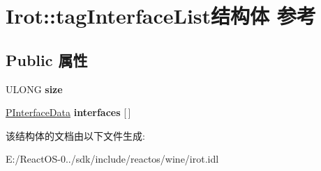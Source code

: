 \hypertarget{struct_irot_1_1tag_interface_list}{}\section{Irot\+:\+:tag\+Interface\+List结构体 参考}
\label{struct_irot_1_1tag_interface_list}
\subsection*{Public 属性}
\begin{DoxyCompactItemize}
\item 
\mbox{\label{struct_irot_1_1tag_interface_list_ac504505d2e5f68445c9104c9f9f237d8}} 
U\+L\+O\+NG {\bfseries size}
\item 
\mbox{\label{struct_irot_1_1tag_interface_list_a2792a16cd2c5a4c26d72063d697e2362}} 
\hyperlink{struct_irot_1_1tag_interface_data}{P\+Interface\+Data} {\bfseries interfaces} \mbox{[}$\,$\mbox{]}
\end{DoxyCompactItemize}


该结构体的文档由以下文件生成\+:\begin{DoxyCompactItemize}
\item 
E\+:/\+React\+O\+S-\/0../sdk/include/reactos/wine/irot.\+idl\end{DoxyCompactItemize}
